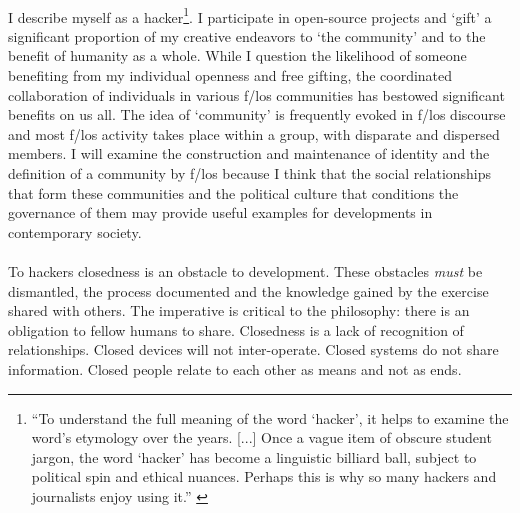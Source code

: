 \documentclass{article}
\begin{document}
\begin{doublespace}
\paragraph{}I describe myself as a hacker\footnote{``To understand the full meaning of the word `hacker', it helps to examine the word's etymology over the years. [...] Once a vague item of obscure student jargon, the word `hacker' has become a linguistic billiard ball, subject to political spin and ethical nuances. Perhaps this is why so many hackers and journalists enjoy using it.'' \cite[Appendix B.]{Williams:2007uq}}. I participate in open-source projects and `gift' a significant proportion of my creative endeavors to `the community' and to the benefit of humanity as a whole. While I question the likelihood of someone benefiting from my individual openness and free gifting, the coordinated collaboration of individuals in various f/los communities has bestowed significant benefits on us all. The idea of `community' is frequently evoked in f/los discourse and most f/los activity takes place within a group, with disparate and dispersed members. I will examine the construction and maintenance of identity \cite{Appadurai:1996lp} and the definition of a community by f/los because I think that the social relationships that form these communities and the political culture that conditions the governance of them may provide useful examples for developments in contemporary society.

\paragraph{}To hackers closedness is an obstacle to development. These obstacles \emph{must} be dismantled, the process documented and the knowledge gained by the exercise shared with others. The imperative is critical to the philosophy: there is an obligation to fellow humans to share. Closedness is a lack of recognition of relationships. Closed devices will not inter-operate. Closed systems do not share information. Closed people relate to each other as means and not as ends.


\end{doublespace}
\end{document}
